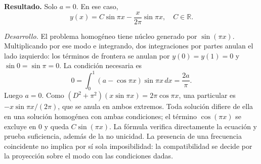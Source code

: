 \noindent\textbf{Resultado.} Solo \(a=0\). En ese caso,
\[y(x)=C\sin\pi x-\frac{x}{2\pi}\sin\pi x,\quad C\in\mathbb R.\]

\noindent\textit{Desarrollo.} El problema homogéneo tiene núcleo generado por \(\sin(\pi x)\).
Multiplicando por ese modo e integrando, dos integraciones por partes anulan el lado izquierdo:
los términos de frontera se anulan por \(y(0)=y(1)=0\) y \(\sin0=\sin\pi=0\).
La condición necesaria es
\[0=\int_0^1(a-\cos\pi x)\sin\pi x\,dx=\frac{2a}\pi.\]
Luego \(a=0\). Como \((D^2+\pi^2)(x\sin\pi x)=2\pi\cos\pi x\), una particular es
\(-x\sin\pi x/(2\pi)\), que se anula en ambos extremos. Toda solución difiere de ella
en una solución homogénea con ambas condiciones; el término \(\cos(\pi x)\) se excluye en 0 y queda \(C\sin(\pi x)\).
La fórmula verifica directamente la ecuación y prueba suficiencia, además de la no unicidad.
La presencia de una frecuencia coincidente no implica por sí sola imposibilidad: la compatibilidad
se decide por la proyección sobre el modo con las condiciones dadas.
